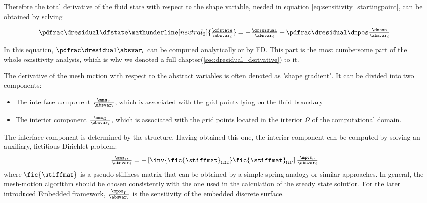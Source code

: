 \documentclass[../main.tex]{subfiles}
\begin{document}
Therefore the total derivative of the fluid state with respect to the shape variable, needed in equation \eqref{eq:sensitivity_startingpoint}, can be obtained by solving

\begin{align}\label{eq:dfstate_by_absvarI}
\PdresidualBYdfstate    \mathunderline[neutral_2]{\displaystyle\DdfstateBYabsvarI}=
-\DdresidualBYabsvarI 
-\PdresidualBYdmms       \DdmmsBYabsvarI
\end{align}


In this equation, $\PdresidualBYabsvarI$ can be computed analytically or by \ac{FD}.
This part is the most cumbersome part of the whole sensitivity analysis, which is why we denoted a full chapter(\ref{sec:dresidual_derivative}) to it.

The derivative of the mesh motion with respect to the abstract variables is often denoted as "shape gradient". It can be divided into two components:
\begin{itemize}
\item The interface component $\tfrac{\mms_\Gamma}{\absvar_i}$, which is associated with the grid points lying on the fluid boundary
\item The interior component $\tfrac{\mms_\Omega}{\absvar_i}$, which is associated with the grid points located in the interior $\Omega$ of the computational domain.
\end{itemize}
The interface component is determined by the structure. Having obtained this one, the interior component can be computed by solving an auxiliary, fictitious Dirichlet problem:
\begin{align}
\tfrac{\mms_\Omega}{\absvar_i}=-\left[\inv{\fic{\stiffmat}_{\Omega\Omega}} \fic{\stiffmat}_{\Omega\Gamma}\right] \tfrac{\mpos_\Gamma}{\absvar_i}
\end{align}
where $\fic{\stiffmat}$ is a pseudo stiffness matrix that can be obtained by a simple spring analogy or similar approaches.
In general, the mesh-motion algorithm should be chosen consistently with the one used in the calculation of the steady state solution.
For the later introduced Embedded framework, $\tfrac{\mpos_\Gamma}{\absvar_i}$ is the sensitivity of the embedded discrete surface.
 \\
 
\end{document}
